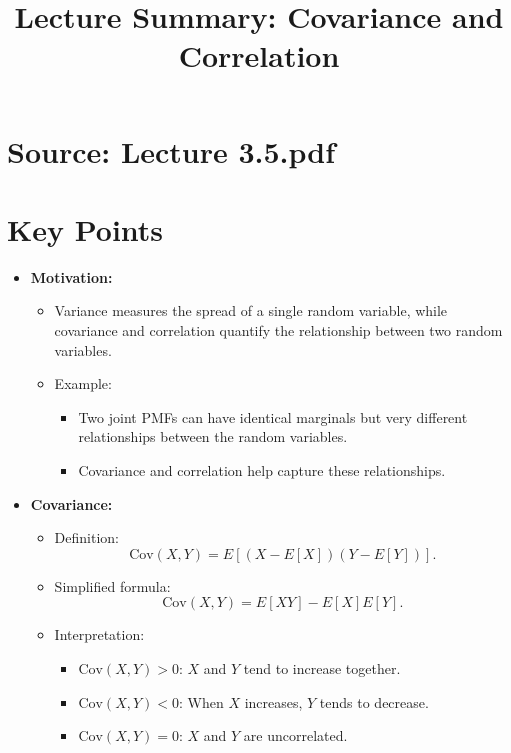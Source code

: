 \documentclass{article}
\title{Lecture Summary: Covariance and Correlation}
\author{}
\date{}
\begin{document}
\maketitle

\section*{Source: Lecture 3.5.pdf}

\section*{Key Points}

\begin{itemize}
  \item \textbf{Motivation:}
    \begin{itemize}
      \item Variance measures the spread of a single random variable, while covariance and correlation quantify the relationship between two random variables.
      \item Example:
        \begin{itemize}
          \item Two joint PMFs can have identical marginals but very different relationships between the random variables.
          \item Covariance and correlation help capture these relationships.
        \end{itemize}
    \end{itemize}

  \item \textbf{Covariance:}
    \begin{itemize}
      \item Definition:
        \[
          \text{Cov}(X, Y) = E\left[(X - E[X])(Y - E[Y])\right].
        \]
      \item Simplified formula:
        \[
          \text{Cov}(X, Y) = E[XY] - E[X]E[Y].
        \]
      \item Interpretation:
        \begin{itemize}
          \item $\text{Cov}(X, Y) > 0$: $X$ and $Y$ tend to increase together.
          \item $\text{Cov}(X, Y) < 0$: When $X$ increases, $Y$ tends to decrease.
          \item $\text{Cov}(X, Y) = 0$: $X$ and $Y$ are uncorrelated.
        \end{itemize}
    \end{itemize}


\end{itemize}
\end{document}
